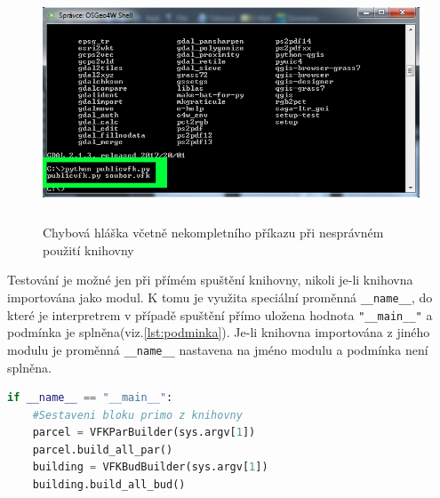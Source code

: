 \begin{figure}[H]
	 \centering
      \includegraphics[height=7cm]{./pictures/testovani_hlaska.png}
      \caption{Chybová hláška včetně nekompletního příkazu při nesprávném použití knihovny}
      \label{fig:testovani_hlaska}
  \end{figure}

Testování je možné jen při přímém spuštění knihovny, nikoli je-li knihovna importována jako modul. K tomu je využita speciální proměnná \verb|__name__|, do které je interpretrem v případě spuštění přímo uložena hodnota \verb|"__main__"| a podmínka je splněna(viz.\ref{lst:podminka}). Je-li knihovna importována z jiného modulu je proměnná \verb|__name__| nastavena na jméno modulu a podmínka není splněna.
\begin{lstlisting}[caption=Ukázka sestavení bloků provedeném jen při přímém spuštění knihovny, language=Python, numbers=none, label=lst:podminka]
if __name__ == "__main__":
	#Sestaveni bloku primo z knihovny
    parcel = VFKParBuilder(sys.argv[1])
    parcel.build_all_par()
    building = VFKBudBuilder(sys.argv[1])
    building.build_all_bud()
\end{lstlisting}
